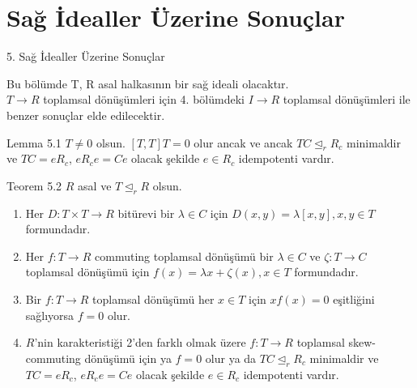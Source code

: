 \documentclass{beamer}
\begin{document}
\section{Sağ İdealler Üzerine Sonuçlar}

\begin{frame}{5. Sağ İdealler Üzerine Sonuçlar}

Bu bölümde T, R asal halkasının bir sağ ideali olacaktır.\\
$T \to R$ toplamsal dönüşümleri için 4. bölümdeki $I \to R$ toplamsal dönüşümleri ile benzer sonuçlar elde edilecektir.
    
\end{frame}

\begin{frame}

\begin{block}{Lemma 5.1}
$T \neq 0$ olsun. $[T,T]T = 0$ olur ancak ve ancak $TC \trianglelefteq_r R_c$ minimaldir ve $TC = eR_c$, $eR_ce = Ce$ olacak şekilde $e \in R_c$ idempotenti vardır.
\end{block}
    
\end{frame}

\begin{frame}

\begin{block}{Teorem 5.2}
$R$ asal ve $T \trianglelefteq_r R$ olsun.
\begin{enumerate}
    \item Her $D \colon T \times T \to R$ bitürevi bir $\lambda \in C$ için $D(x,y) = \lambda[x,y], x, y \in T$ formundadır.
    \item Her $f \colon T \to R$ commuting toplamsal dönüşümü bir $\lambda \in C$ ve $\zeta \colon T \to C$ toplamsal dönüşümü için $f(x) = \lambda x + \zeta(x), x \in T$ formundadır.
    \item Bir $f \colon T \to R$ toplamsal dönüşümü her $x \in T$ için $xf(x) = 0$ eşitliğini sağlıyorsa $f = 0$ olur.
    \item $R$'nin karakteristiği 2'den farklı olmak üzere $f \colon T \to R$ toplamsal skew-commuting dönüşümü için ya $f = 0$ olur ya da $TC \trianglelefteq_r R_c$ minimaldir ve $TC = eR_c$, $eR_ce = Ce$ olacak şekilde $e \in R_c$ idempotenti vardır.
\end{enumerate}
\end{block}
    
\end{frame}
\end{document}
